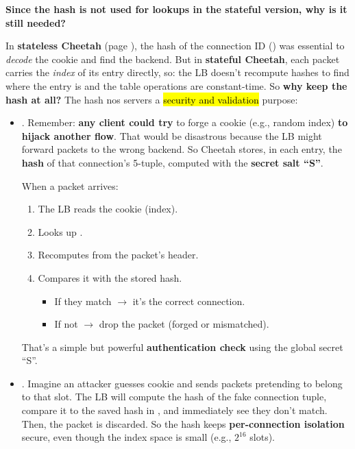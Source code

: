 \highspace
\begin{flushleft}
    \textcolor{Green3}{ \textbf{Since the hash is not used for lookups in the stateful version, why is it still needed?}}
\end{flushleft}
In \textbf{stateless Cheetah} (page ), the hash of the connection ID () was essential to \emph{decode} the cookie and find the backend. But in \textbf{stateful Cheetah}, each packet carries the \emph{index} of its entry directly, so: the LB doesn't recompute hashes to find where the entry is and the table operations are constant-time. So \textbf{why keep the hash at all?} The hash nos servers a \hl{security and validation} purpose:
\begin{itemize}
    \item {}. Remember: \textbf{any client could try} to forge a cookie (e.g., random index) \textbf{to hijack another flow}. That would be disastrous because the LB might forward packets to the wrong backend. So Cheetah stores, in each  entry, the \textbf{hash} of that connection's 5-tuple, computed with the \textbf{secret salt ``S''}.

    \newpage

    When a packet arrives:
    \begin{enumerate}
        \item The LB reads the cookie (index).
        \item Looks up .
        \item Recomputes  from the packet's header.
        \item Compares it with the stored hash.
        \begin{itemize}
            \item[\textcolor{Green3}{\faIcon{check}}] If they match $\to$ it's the correct connection.
            \item[\textcolor{Red2}{\faIcon{times}}] If not $\to$ drop the packet (forged or mismatched).
        \end{itemize}
    \end{enumerate}
    That's a simple but powerful \textbf{authentication check} using the global secret ``S''.

    
    \item {}. Imagine an attacker guesses cookie  and sends packets pretending to belong to that slot. The LB will compute the hash of the fake connection tuple, compare it to the saved hash in , and immediately see they don't match. Then, the packet is discarded. So the hash keeps \textbf{per-connection isolation} secure, even though the index space is small (e.g., $2^{16}$ slots).
    

\end{itemize}
